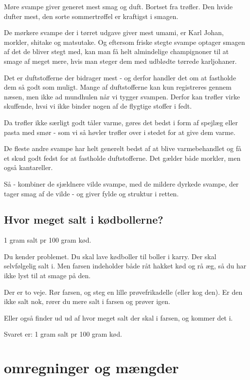 \documentclass[
]{book}
\begin{document}
Møre svampe giver generet mest smag og duft. Bortset fra trøfler. Den hvide dufter
mest, den sorte sommertrøffel er kraftigst i smagen.

De mørkere svampe der i tørret udgave giver mest umami, er Karl Johan, morkler,
shitake og matsutake. Og eftersom friske stegte svampe optager smagen af det
de bliver stegt med, kan man få helt almindelige champignoner til at smage af
meget mere, hvis man steger dem med udblødte tørrede karljohaner.

Det er duftstofferne der bidrager mest - og derfor handler det om at fastholde
dem så godt som muligt. Mange af duftstofferne kan kun registreres gennem næsen,
men ikke ad mundhulen når vi tygger svampen. Derfor kan trøfler virke skuffende,
hvsi vi ikke binder nogen af de flygtige stoffer i fedt.

Da trøfler ikke særligt godt tåler varme, gøres det bedst i form af spejlæg eller
pasta med smør - som vi så høvler trøfler over i stedet for at give dem varme.

De fleste andre svampe har helt generelt bedst af at blive varmebehandlet og
få et skud godt fedst for at fastholde duftstofferne. Det gælder både morkler,
men også kantareller.

Så - kombiner de sjældnere vilde svampe, med de mildere dyrkede svampe,
der tager smag af de vilde - og giver fylde og struktur i retten.

\section{Hvor meget salt i kødbollerne?}\label{hvor-meget-salt-i-kuxf8dbollerne}

1 gram salt pr 100 gram kød.

Du kender problemet. Du skal lave kødboller til boller i karry. Der skal selvfølgelig salt i. Men farsen indeholder både råt hakket kød og rå æg, så du har ikke lyst til at smage på den.

Der er to veje. Rør farsen, og steg en lille prøvefrikadelle (eller kog den). Er den ikke salt nok, rører du mere salt i farsen og prøver igen.

Eller også finder ud ud af hvor meget salt der skal i farsen, og kommer det i.

Svaret er: 1 gram salt pr 100 gram kød.

\chapter{omregninger og mængder}\label{omregninger-og-muxe6ngder}
\end{document}
